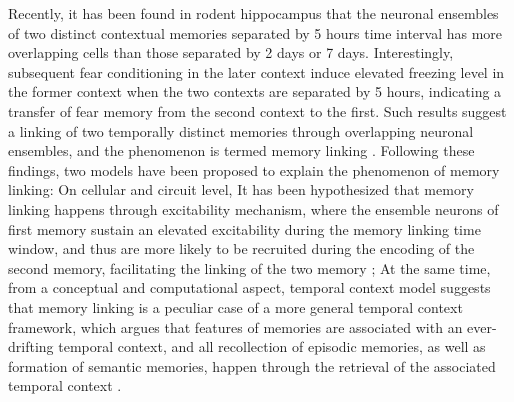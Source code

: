 \documentclass[master.tex]{subfiles}
\begin{document}
Recently, it has been found in rodent hippocampus that the neuronal ensembles of
two distinct contextual memories separated by 5 hours time interval has more
overlapping cells than those separated by 2 days or 7 days. Interestingly,
subsequent fear conditioning in the later context induce elevated freezing level
in the former context when the two contexts are separated by 5 hours, indicating
a transfer of fear memory from the second context to the first. Such results
suggest a linking of two temporally distinct memories through overlapping
neuronal ensembles, and the phenomenon is termed memory linking
\cite{cai_shared_2016}. Following these findings, two models have been proposed
to explain the phenomenon of memory linking: On cellular and circuit level, It
has been hypothesized that memory linking happens through excitability
mechanism, where the ensemble neurons of first memory sustain an elevated
excitability during the memory linking time window, and thus are more likely to
be recruited during the encoding of the second memory, facilitating the linking
of the two memory \cite{kastellakis_linking_2016}; At the same time, from a
conceptual and computational aspect, temporal context model suggests that memory
linking is a peculiar case of a more general temporal context framework, which
argues that features of memories are associated with an ever-drifting temporal
context, and all recollection of episodic memories, as well as formation of
semantic memories, happen through the retrieval of the associated temporal
context \cite{howard_temporal_2005}.
\end{document}
